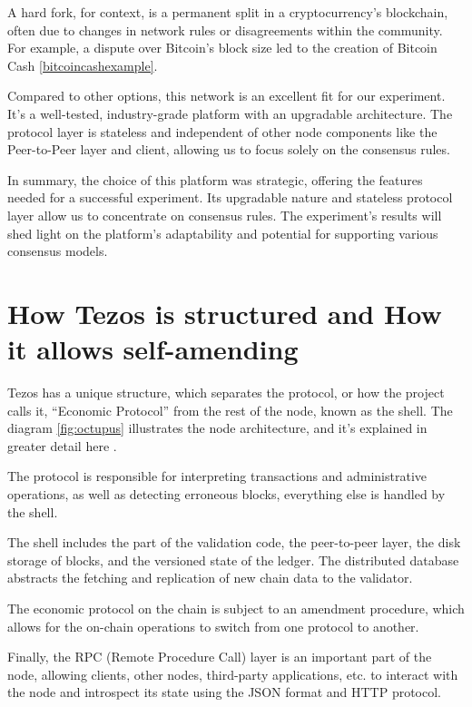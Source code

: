 A hard fork, for context, is a permanent split in a cryptocurrency's blockchain, often due to changes in network rules or disagreements within the community. For example, a dispute over Bitcoin's block size led to the creation of Bitcoin Cash \ref{bitcoincashexample}.

Compared to other options, this network is an excellent fit for our experiment. It's a well-tested, industry-grade platform with an upgradable architecture. The protocol layer is stateless and independent of other node components like the Peer-to-Peer layer and client, allowing us to focus solely on the consensus rules.

In summary, the choice of this platform was strategic, offering the features needed for a successful experiment. Its upgradable nature and stateless protocol layer allow us to concentrate on consensus rules. The experiment's results will shed light on the platform's adaptability and potential for supporting various consensus models.



\section{How Tezos is structured and How it allows self-amending}

Tezos has a unique structure, which separates the protocol, or how the project calls it, ``Economic Protocol'' from the rest of the node, known as the shell. The diagram \ref{fig:octupus} illustrates the node architecture, and it's explained in greater detail here \cite{nomadiclabsdocs}.

The protocol is responsible for interpreting transactions and administrative operations, as well as detecting erroneous blocks, everything else is handled by the shell.

The shell includes the part of the validation code, the peer-to-peer layer, the disk storage of blocks, and the versioned state of the ledger.
The distributed database abstracts the fetching and replication of new chain data to the validator.

The economic protocol on the chain is subject to an amendment procedure, which allows for the on-chain operations to switch from one protocol to another.

Finally, the RPC (Remote Procedure Call) layer is an important part of the node, allowing clients, other nodes, third-party applications, etc. to interact with the node and introspect its state using the JSON format and HTTP protocol.

